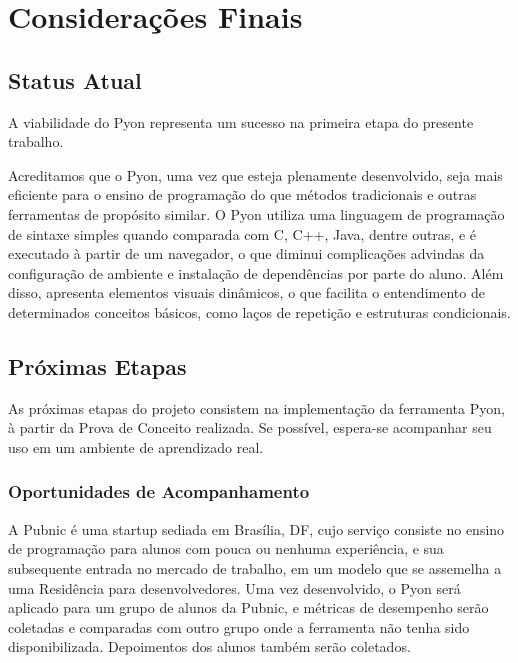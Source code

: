 \chapter*[Considerações Finais]{Considerações Finais}

\section{Status Atual}

A viabilidade do Pyon representa um sucesso na primeira etapa do presente trabalho. 

Acreditamos que o Pyon, uma vez que esteja plenamente desenvolvido, seja mais eficiente para o ensino de programação do que métodos tradicionais e outras ferramentas de propósito similar.
O Pyon utiliza uma linguagem de programação de sintaxe simples quando comparada com C, C++, Java, dentre outras, e é executado à partir de um navegador, o que diminui complicações advindas da configuração de ambiente e instalação de dependências por parte do aluno. Além disso, apresenta elementos visuais dinâmicos, o que facilita o entendimento de determinados conceitos básicos, como laços de repetição e estruturas condicionais.

\section{Próximas Etapas}

As próximas etapas do projeto consistem na implementação da ferramenta Pyon, à partir da Prova de Conceito realizada. Se possível, espera-se acompanhar seu uso em um ambiente de aprendizado real.

\subsection{Oportunidades de Acompanhamento}

A Pubnic é uma startup sediada em Brasília, DF, cujo serviço consiste no ensino de
programação para alunos com pouca ou nenhuma experiência, e sua subsequente entrada no
mercado de trabalho, em um modelo que se assemelha a uma Residência para desenvolvedores.
Uma vez desenvolvido, o Pyon será aplicado para um grupo de alunos da Pubnic, e métricas de
desempenho serão coletadas e comparadas com outro grupo onde a ferramenta não tenha sido
disponibilizada. Depoimentos dos alunos também serão coletados.